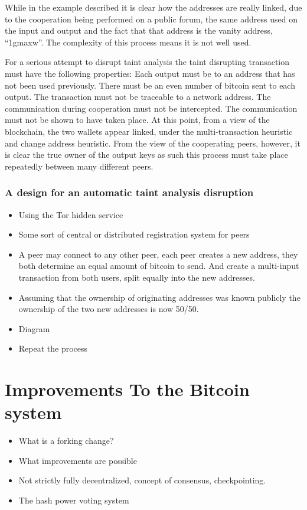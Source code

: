 While in the example described it is clear how the addresses are really linked,
due to the cooperation being performed on a public forum, the same address used
on the input and output and the fact that that address is the vanity address,
``1gmaxw''. The complexity of this process means it is not well used.

For a serious attempt to disrupt taint analysis the taint disrupting transaction
must have the following properties:  Each output must be to an address that has
not been used previously. There must be an even number of bitcoin sent to each
output. The transaction must not be traceable to a network address.  The
communication during cooperation must not be intercepted. The communication must
not be shown to have taken place.  At this point, from a view of the blockchain,
the two wallets appear linked, under the multi-transaction heuristic and change
address heuristic. From the view of the cooperating peers, however, it is clear
the true owner of the output keys as such this process must take place
repeatedly between many different peers.

\subsubsection{A design for an automatic taint analysis disruption}

\begin{itemize} \item Using the Tor hidden service \item Some sort of central or
        distributed registration system for peers \item A peer may connect to
            any other peer, each peer creates a new address, they both determine
            an equal amount of bitcoin to send. And create a multi-input
            transaction from both users, split equally into the new addresses.
\item Assuming that the ownership of originating addresses was known publicly
the ownership of the two new addresses is now 50/50.  \item Diagram \item Repeat
the process \end{itemize}

\section{Improvements To the Bitcoin system}

\begin{itemize} \item What is a forking change?  \item What improvements are
possible \item Not strictly fully decentralized, concept of consensus,
checkpointing.  \item The hash power voting system \end{itemize}


